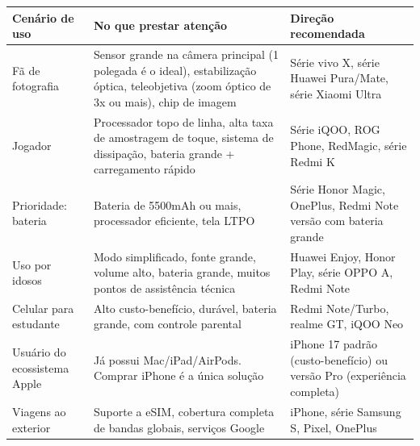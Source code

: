 \begin{center}
\begin{tabularx}{\linewidth}{|X|X|X|}
\hline
\textbf{Cenário de uso} & \textbf{No que prestar atenção} & \textbf{Direção recomendada} \tabularnewline
\hline
Fã de fotografia & Sensor grande na câmera principal (1 polegada é o ideal), estabilização óptica, teleobjetiva (zoom óptico de 3x ou mais), chip de imagem & Série vivo X, série Huawei Pura/Mate, série Xiaomi Ultra \tabularnewline
Jogador & Processador topo de linha, alta taxa de amostragem de toque, sistema de dissipação, bateria grande + carregamento rápido & Série iQOO, ROG Phone, RedMagic, série Redmi K \tabularnewline
Prioridade: bateria & Bateria de 5500mAh ou mais, processador eficiente, tela LTPO & Série Honor Magic, OnePlus, Redmi Note versão com bateria grande \tabularnewline
Uso por idosos & Modo simplificado, fonte grande, volume alto, bateria grande, muitos pontos de assistência técnica & Huawei Enjoy, Honor Play, série OPPO A, Redmi Note \tabularnewline
Celular para estudante & Alto custo-benefício, durável, bateria grande, com controle parental & Redmi Note/Turbo, realme GT, iQOO Neo \tabularnewline
Usuário do ecossistema Apple & Já possui Mac/iPad/AirPods. Comprar iPhone é a única solução & iPhone 17 padrão (custo-benefício) ou versão Pro (experiência completa) \tabularnewline
Viagens ao exterior & Suporte a eSIM, cobertura completa de bandas globais, serviços Google & iPhone, série Samsung S, Pixel, OnePlus \tabularnewline
\hline
\end{tabularx}
\end{center}


